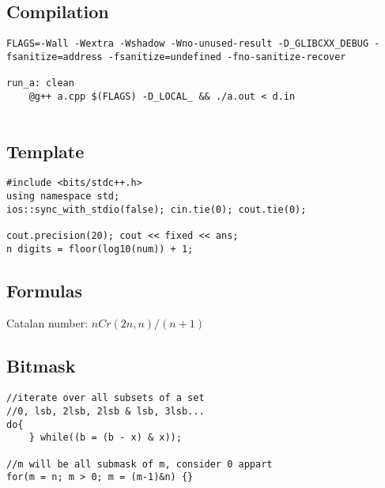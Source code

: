 \documentclass[a4paper]{article}
\begin{document}
\subsection*{Compilation}

\begin{verbatim}
FLAGS=-Wall -Wextra -Wshadow -Wno-unused-result -D_GLIBCXX_DEBUG -fsanitize=address -fsanitize=undefined -fno-sanitize-recover

run_a: clean
	@g++ a.cpp $(FLAGS) -D_LOCAL_ && ./a.out < d.in


\end{verbatim}
\subsection*{Template}
\begin{verbatim}
#include <bits/stdc++.h>
using namespace std;
ios::sync_with_stdio(false); cin.tie(0); cout.tie(0);

cout.precision(20); cout << fixed << ans;
n digits = floor(log10(num)) + 1;
\end{verbatim}
\subsection*{Formulas}
Catalan number: $nCr(2n, n) / (n+1)$
\subsection*{Bitmask}
\begin{verbatim}
//iterate over all subsets of a set
//0, lsb, 2lsb, 2lsb & lsb, 3lsb...
do{
    } while((b = (b - x) & x));

//m will be all submask of m, consider 0 appart
for(m = n; m > 0; m = (m-1)&n) {}
\end{verbatim}
\end{document}
